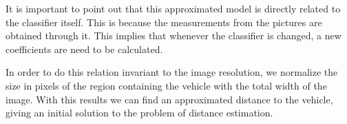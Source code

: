 It is important to point out that this approximated model is directly related to
the classifier itself. This is because the measurements from the pictures are
obtained through it. This implies that whenever the classifier is changed, a new
coefficients are need to be calculated.

In order to do this relation invariant to the image resolution, we normalize the
size in pixels of the region containing the vehicle with the total width of the
image. With this results we can find  an approximated distance to the
vehicle, giving an initial solution to the problem of distance estimation.

